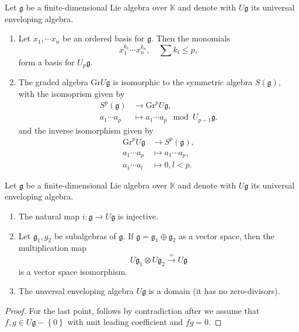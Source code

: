 \documentclass{report}
\begin{document}
\begin{theorem}
    Let $\mathfrak g$ be a finite-dimensional Lie algebra over $\mathbb K$ and denote with $U \mathfrak g$ its universal enveloping algebra.
    \begin{enumerate}[label = (\roman*)]
        \item Let $x_1, \cdots x_n$ be an ordered basis for $\mathfrak g$.
        Then the monomials
        \[
        x_1^{k_1} \cdots x_n^{k_n}, \quad \sum k_i \leq p,
        \]
        form a basis for $U_p \mathfrak g$.
        \item The graded algebra $\mathrm{Gr}U \mathfrak g$ is isomorphic to the symmetric algebra $S(\mathfrak g)$, with the isomoprism given by
        \begin{align*}
            S^p(\mathfrak g) &\to \mathrm{Gr}^p U \mathfrak g,\\
            a_1 \cdots a_p &\mapsto a_1 \cdots a_p \mod U_{p-1} \mathfrak g.
        \end{align*}
        and the inverse isomorphism given by
        \begin{align*}
            \mathrm{Gr}^p U \mathfrak g &\to S^p(\mathfrak g),\\
            a_1 \cdots a_p  &\mapsto a_1 \cdots a_p,\\
            a_1 \cdots a_l &\mapsto 0, l < p.
        \end{align*}
    \end{enumerate} 
\end{theorem}

\begin{corollary}
    Let $\mathfrak g$ be a finite-dimensional Lie algebra over $\mathbb K$ and denote with $U \mathfrak g$ its universal enveloping algebra.
    \begin{enumerate}[label = (\roman*)]
        \item The natural map $i: \mathfrak g \to U \mathfrak g$ is injective.
        \item Let $\mathfrak g_1, g_2$ be subalgebras of $\mathfrak g$.
        If $\mathfrak g = \mathfrak g_1 \oplus \mathfrak g_2$ as a vector space, then the multiplication map
        \[
        U \mathfrak g_1 \otimes U \mathfrak g_2 \overset{\simeq}{\to} U \mathfrak g
        \]
        is a vector space isomorphism.
        \item The unversal enveloping algebra $U \mathfrak g$ is a domain (it has no zero-divisors).
    \end{enumerate}
\end{corollary}
\begin{proof}
    For the last point, follows by contradiction after we assume that $f, g \in U \mathfrak g - \left\{ 0 \right\}$ with unit leading coefficient and $f g = 0$.
\end{proof}
\end{document}
